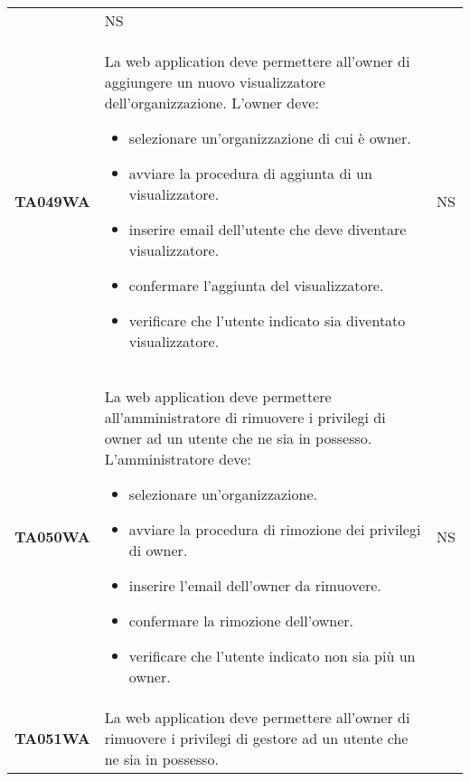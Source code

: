 \documentclass[../piano-di-qualifica.tex]{subfiles}
\begin{document}
\begin{longtable}[H]{>{\centering\bfseries}m{3cm} >{}m{10cm} >{\centering\arraybackslash}m{3cm}}
                    & NS                                                                                                                                                                                                                                                               \\
  TA049WA           & La web application deve permettere all'owner di aggiungere un nuovo visualizzatore dell'organizzazione. \newline
  L'owner deve:
  \begin{itemize}
    \item selezionare un'organizzazione di cui è owner.
    \item avviare la procedura di aggiunta di un visualizzatore.
    \item inserire email dell'utente che deve diventare visualizzatore.
    \item confermare l'aggiunta del visualizzatore.
    \item verificare che l'utente indicato sia diventato visualizzatore.
  \end{itemize}
                    & NS                                                                                                                                                                                                                                                               \\
  TA050WA           & La web application deve permettere all'amministratore di rimuovere i privilegi di owner ad un utente che ne sia in possesso. \newline
  L'amministratore deve:
  \begin{itemize}
    \item selezionare un'organizzazione.
    \item avviare la procedura di rimozione dei privilegi di owner.
    \item inserire l'email dell'owner da rimuovere.
    \item confermare la rimozione dell'owner.
    \item verificare che l'utente indicato non sia più un owner.
  \end{itemize}
                    & NS                                                                                                                                                                                                                                                               \\
  TA051WA           & La web application deve permettere all'owner di rimuovere i privilegi di gestore ad un utente che ne sia in possesso. \newline

\end{longtable}
\end{document}
